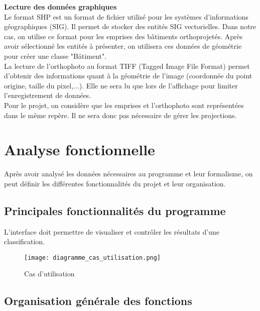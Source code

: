 \noindent\textbf{Lecture des données graphiques}\\

Le format SHP est un format de fichier utilisé pour les systèmes d'informations géographiques (SIG). Il permet de stocker des entités SIG vectorielles. Dans notre cas, on utilise ce format pour les emprises des bâtiments orthoprojetés. Après avoir sélectionné les entités à présenter, on utilisera ces données de géométrie pour créer une classe "Bâtiment".\\

La lecture de l'orthophoto au format TIFF (Tagged Image File Format) permet d'obtenir des informations quant à la géométrie de l'image (coordonnée du point origine, taille du pixel,...). Elle ne sera lu que lors de l'affichage pour limiter l'enregistrement de données.\\

Pour le projet, on considère que les emprises et l'orthophoto sont représentées dans le même repère. Il ne sera donc pas nécessaire de gérer les projections.\\

\section{Analyse fonctionnelle}

Après avoir analysé les données nécessaires au programme et leur formalisme, on peut définir les différentes fonctionnalités du projet et leur organisation.\newline

\subsection{Principales fonctionnalités du programme}

L'interface doit permettre de visualiser et contrôler les résultats d'une classification.

\begin{figure}[h]
	\begin{center}
		\texttt{[image: diagramme\_cas\_utilisation.png]}  \\
		\caption[Cas d'utilisation]{Cas d'utilisation}
		\label{fig:utilisation}
	\end{center}
\end{figure}


\subsection{Organisation générale des fonctions}

